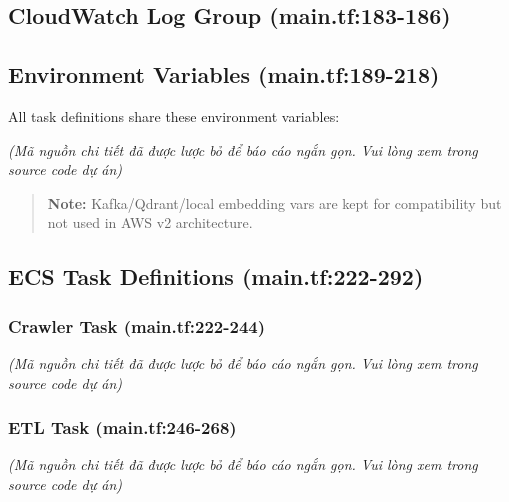 \hypertarget{cloudwatch-log-group-main.tf183-186}{%
\subsection{CloudWatch Log Group
(main.tf:183-186)}}

\begin{Shaded}
\begin{Highlighting}[]
\NormalTok{\}}
\end{Highlighting}
\end{Shaded}

\hypertarget{environment-variables-main.tf189-218}{%
\subsection{Environment Variables
(main.tf:189-218)}}

All task definitions share these environment variables:

\emph{(Mã nguồn chi tiết đã được lược bỏ để báo cáo ngắn gọn. Vui lòng
xem trong source code dự án)}

\begin{quote}
\textbf{Note:} Kafka/Qdrant/local embedding vars are kept for
compatibility but not used in AWS v2 architecture.
\end{quote}

\hypertarget{ecs-task-definitions-main.tf222-292}{%
\subsection{ECS Task Definitions
(main.tf:222-292)}}

\hypertarget{crawler-task-main.tf222-244}{%
\subsubsection{Crawler Task
(main.tf:222-244)}}

\emph{(Mã nguồn chi tiết đã được lược bỏ để báo cáo ngắn gọn. Vui lòng
xem trong source code dự án)}

\hypertarget{etl-task-main.tf246-268}{%
\subsubsection{ETL Task
(main.tf:246-268)}}

\emph{(Mã nguồn chi tiết đã được lược bỏ để báo cáo ngắn gọn. Vui lòng
xem trong source code dự án)}

